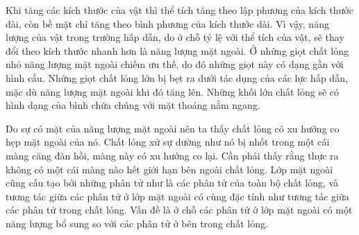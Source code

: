 
Khi tăng các kích thước của vật thì thể tích tăng theo lập phương của kích thước dài, còn bề mặt chỉ tăng theo bình phương của kích thước dài. Vì vậy, năng lượng của vật trong trường hấp dẫn, do ở chỗ tỷ lệ với thể tích của vật, sẽ thay đổi theo kích thước nhanh hơn là năng lượng mặt ngoài. Ở những giọt chất lỏng nhỏ năng lượng mặt ngoài chiếm ưu thế, do đó những giọt này có dạng gần với hình cầu. Những giọt chất lỏng lớn bị bẹt ra dưới tác dụng của các lực hấp dẫn, mặc dù năng lượng mặt ngoài khi đó tăng lên. Những khối lớn chất lỏng sẽ có hình dạng của bình chứa chúng với mặt thoáng nằm ngang. 


Do sự có mặt của năng lượng mặt ngoài nên ta thấy chất lỏng có xu hướng co hẹp mặt ngoài của nó. Chất lỏng xử sự dường như nó bị nhốt trong một cái màng căng đàn hồi, màng này có xu hướng co lại. Cần phải thấy rằng thực ra không có một cái màng nào hết giới hạn bên ngoài chất lỏng. Lớp mặt ngoài cũng cấu tạo bởi những phân tử như là các phân tử của toàn bộ chất lỏng, và tương tác giữa các phân tử ở lớp mặt ngoài có cùng đặc tính như tương tác giữa các phân tử trong chất lỏng. Vấn đề là ở chỗ các phân tử ở lớp mặt ngoài có một năng lượng bổ sung so với các phân tử ở bên trong chất lỏng.

